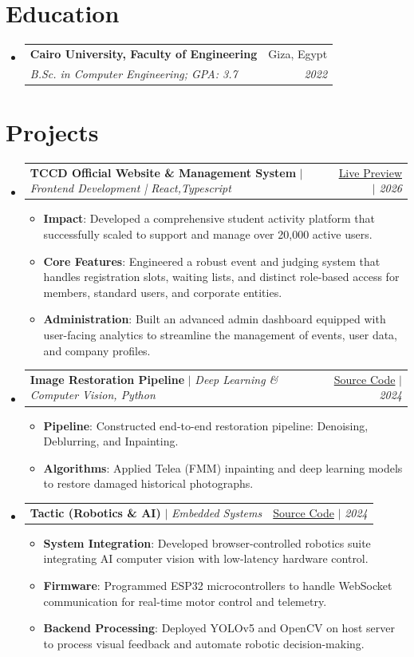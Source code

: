 \documentclass[letterpaper,11pt]{article}
\makeatletter
\newcommand{\resumeItem}[2]{\item\small{\textbf{#1}{: #2 \vspace{-2pt}}}}
\newcommand{\resumeSubheading}[4]{
  \vspace{-1pt}\item
    \begin{tabular*}{0.97\textwidth}{l@{\extracolsep{\fill}}r}
      \textbf{#1} & #2 \\
      \textit{\small#3} & \textit{\small #4} \\
    \end{tabular*}\vspace{-5pt}
}
\newcommand{\resumeProjectSubheading}[3]{
  \vspace{-1pt}\item
    \begin{tabular*}{0.97\textwidth}{l@{\extracolsep{\fill}}r}
      \textbf{#1} $|$ \textit{\small#2} & #3 \\
    \end{tabular*}\vspace{-5pt}
}
\newcommand{\resumeSubHeadingListStart}{\begin{itemize}[leftmargin=*]}
\newcommand{\resumeSubHeadingListEnd}{\end{itemize}}
\newcommand{\resumeItemListStart}{\begin{itemize}}
\newcommand{\resumeItemListEnd}{\end{itemize}\vspace{-5pt}}
\makeatother
\begin{document}
\section{Education}
  \resumeSubHeadingListStart
    \resumeSubheading
      {Cairo University, Faculty of Engineering}{Giza, Egypt}
      {B.Sc. in Computer Engineering;  GPA: 3.7}{2022}
  \resumeSubHeadingListEnd
\section{Projects}
  \resumeSubHeadingListStart
    \resumeProjectSubheading
      {TCCD Official Website \& Management System}{Frontend Development | React,Typescript}{\href{https://tccd.eng.cu.edu.eg/}{Live Preview} $|$ \textit{\small 2026}}
      \resumeItemListStart
        \resumeItem{Impact}
          {Developed a comprehensive student activity platform that successfully scaled to support and manage over 20,000 active users.}
        \resumeItem{Core Features}
          {Engineered a robust event and judging system that handles registration slots, waiting lists, and distinct role-based access for members, standard users, and corporate entities.}
        \resumeItem{Administration}
          {Built an advanced admin dashboard equipped with user-facing analytics to streamline the management of events, user data, and company profiles.}
      \resumeItemListEnd
    \vspace{4pt}
    \resumeProjectSubheading
      {Image Restoration Pipeline}{Deep Learning \& Computer Vision, Python}{\href{https://github.com/ahmedfathy0-0/Image-Colorization-of-Historical-Photos}{Source Code} $|$ \textit{\small 2024}}
      \resumeItemListStart
        \resumeItem{Pipeline}
          {Constructed end-to-end restoration pipeline: Denoising, Deblurring, and Inpainting.}
        \resumeItem{Algorithms}
          {Applied Telea (FMM) inpainting and deep learning models to restore damaged historical photographs.}
      \resumeItemListEnd
    \vspace{4pt}
    \resumeProjectSubheading
      {Tactic (Robotics \& AI)}{Embedded Systems}{\href{https://github.com/roboSobia}{Source Code} $|$ \textit{\small 2024}}
      \resumeItemListStart
        \resumeItem{System Integration}
          {Developed browser-controlled robotics suite integrating AI computer vision with low-latency hardware control.}
        \resumeItem{Firmware}
          {Programmed ESP32 microcontrollers to handle WebSocket communication for real-time motor control and telemetry.}
        \resumeItem{Backend Processing}
          {Deployed YOLOv5 and OpenCV on host server to process visual feedback and automate robotic decision-making.}
      \resumeItemListEnd
  \resumeSubHeadingListEnd
\end{document}
